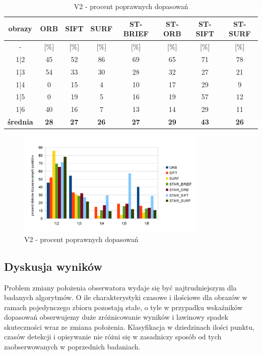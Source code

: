 \begin{table}[htbp]
  \centering
  \caption{V2 - procent poprawnych dopasowań}
    \begin{tabular}{|c|c|c|c|c|c|c|c|}\hline
    obrazy & \textbf{ORB} & \textbf{SIFT} & \textbf{SURF} & \textbf{ST-BRIEF} & \textbf{ST-ORB} & \textbf{ST-SIFT} & \textbf{ST-SURF} \\\hline
     - & [\%] & [\%] & [\%] & [\%] & [\%] & [\%] & [\%] \\\hline
    1|2 & 45 & 52 & 86 & 69 & 65 & 71 & 78 \\
    1|3 & 54 & 33 & 30 & 28 & 32 & 27 & 21 \\
    1|4 & 0 & 15 & 4 & 10 & 17 & 29 & 9 \\
    1|5 & 0 & 19 & 5 & 16 & 19 & 57 & 12 \\
    1|6 & 40 & 16 & 7 & 13 & 14 & 29 & 11 \\\hline
    \textbf{średnia} & \textbf{28} & \textbf{27} & \textbf{26} & \textbf{27} & \textbf{29} & \textbf{43} & \textbf{26} \\\hline
    
    \end{tabular}%
  \label{tab:v2_m2}%
\end{table}%


\begin{figure}
\centering
\includegraphics[width=0.8\textwidth]{pict/slowik/v2/m2.png}
\caption{V2 - procent poprawnych dopasowań}
\label{fig:v2_m2}
\end{figure}



\subsection{Dyskusja wyników}
Problem zmiany położenia obserwatora wydaje się być najtrudniejszym dla badanych algorytmów. O ile charakterystyki czasowe i ilościowe dla obrazów w ramach pojedynczego zbioru pozostają stałe, o tyle w przypadku wskaźników dopasowań obserwujemy duże zróżnicowanie wyników i lawinowy spadek skuteczności wraz ze zmiana położenia. Klasyfikacja w dziedzinach ilości punktu, czasów detekcji i opisywanie nie różni się w zasadniczy sposób od tych zaobserwowanych w poprzednich badaniach.

